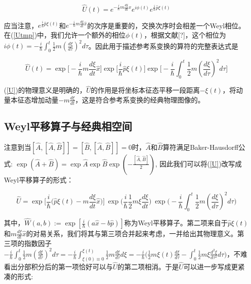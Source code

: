 \documentclass[a4paper]{article}
\begin{document}
        \begin{equation}\label{Utmp}
            \hat{U}(t)=e^{-\frac{i}{\hbar}m\frac{d\xi}{dt}\hat{x}}e^{i\phi(t)} e^{\frac{i}{\hbar}\hat{p}\xi(t)}
        \end{equation}

        应当注意，$e^{\frac{i}{\hbar}\hat{p}\xi(t)}$和$e^{-\frac{i}{\hbar}m\frac{d\xi}{dt}\hat{x}}$的次序是重要的，交换次序时会相差一个Weyl相位。在(\ref{Utmp})中，我们允许一个额外的相位$\phi(t)$，根据文献[?]，这个相位为$i\phi(t)=-\frac{i}{\hbar}\int_0^t\frac{1}{2}m(\frac{d \xi}{d\tau})^2 d\tau$。因此用于描述参考系变换的算符的完整表达式是

        \begin{equation}\label{U}
            \hat{U}(t) = \exp\biggl[-\frac{i}{\hbar}m\frac{d\xi}{dt}\hat{x}\biggr] \exp\biggl[\frac{i}{\hbar}\hat{p}\xi(t)\biggr] \exp\biggl[-\frac{i}{\hbar}\int_0^t\frac{1}{2}m(\frac{d \xi}{d\tau})^2 d\tau\biggr]
        \end{equation}

        (\ref{U})的物理意义是明确的，$\hat{U}$的作用是将坐标本征态平移一段距离$-\xi(t)$，将动量本征态增加动量$-m\frac{d \xi}{dt}$，这是符合参考系变换的经典物理图像的。

    \subsection{Weyl平移算子与经典相空间}

        注意到当$[\hat{A}, [\hat{A}, \hat{B}]]=[\hat{B}, [\hat{A}, \hat{B}]]=0$时，$\hat{A}$和$\hat{B}$算符满足Baker-Hausdorff公式: $\exp(\hat{A}+\hat{B})=\exp\hat{A} \exp\hat{B} \exp(-\frac{[\hat{A}, \hat{B}]}{2})$, 因此我们可以将(\ref{U})改写成Weyl平移算子的形式：

        \begin{equation}
            \hat{U}=\exp\bigg[\frac{i}{\hbar}\bigg(\hat{p}\xi(t)-m\frac{d\xi}{dt}\hat{x} \bigg) \bigg]\ \exp\bigg(\frac{i}{\hbar}\frac{1}{2}m\xi\frac{d\xi}{dt} \bigg)\ \exp\bigg(-\frac{i}{\hbar}\int_0^t\frac{1}{2}m(\frac{d \xi}{d\tau})^2 d\tau \bigg)
        \end{equation}

        其中，$\hat{W}(a,b):=\exp[\frac{i}{\hbar}(a\hat{x}-b\hat{p})]$称为Weyl平移算子。第二项来自于$\hat{p}\xi(t)$和$m\frac{d\xi}{dt}\hat{x}$的对易关系，我们将其与第三项合并起来考虑，一并给出其物理意义。第三项的指数因子$-\frac{i}{\hbar}\int_0^t\frac{1}{2}m(\frac{d \xi}{d\tau})^2 d\tau = -\frac{i}{\hbar}\int_{\xi(0)\equiv 0}^{\xi(t)}\frac{1}{2}m\frac{d \xi}{d\tau} d\xi = -\frac{i}{\hbar}\bigg(\frac{1}{2}m\xi(t)\frac{d \xi}{d\tau}-\int_0^t\frac{1}{2}m\xi\frac{d^2\xi}{d\tau^2} d\tau\bigg)$，不难看出分部积分后的第一项恰好可以与$\hat{U}$的第二项相消。于是$\hat{U}$可以进一步写成更紧凑的形式:
\end{document}
